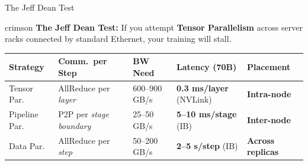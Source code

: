\documentclass[aspectratio=169, 12pt]{beamer}
\begin{document}
\begin{frame}{The Jeff Dean Test}

\small
\begin{mlsyscard}{crimson}
\textbf{The Jeff Dean Test:} If you attempt \textbf{Tensor Parallelism} across server racks connected by standard Ethernet, your training will stall.
\end{mlsyscard}

\vspace{0.1cm}
\renewcommand{\arraystretch}{1.15}
{\scriptsize
\begin{tabular}{@{}lllll@{}}
  \toprule
  \textbf{Strategy} & \textbf{Comm.\ per Step} & \textbf{BW Need} & \textbf{Latency (70B)} & \textbf{Placement} \\
  \midrule
  Tensor Par. & AllReduce per \emph{layer} & 600--900 GB/s & \textbf{0.3 ms/layer} (NVLink) & \textcolor{computestroke}{\textbf{Intra-node}} \\
  Pipeline Par. & P2P per \emph{stage boundary} & 25--50 GB/s & \textbf{5--10 ms/stage} (IB) & \textcolor{datastroke}{\textbf{Inter-node}} \\
  Data Par. & AllReduce per \emph{step} & 50--200 GB/s & \textbf{2--5 s/step} (IB) & \textcolor{routingstroke}{\textbf{Across replicas}} \\
  \bottomrule
\end{tabular}
}

\vspace{0.15cm}

\end{frame}
\end{document}
